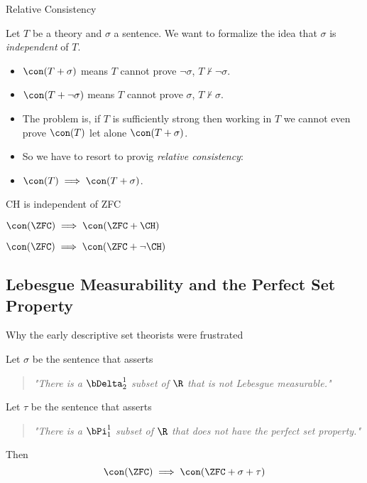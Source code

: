\documentclass{beamer}
\begin{document}
\begin{frame}{Relative Consistency}

Let $T$ be a theory and $\sigma$ a sentence. We want to formalize the
idea that $\sigma$ is \emph{independent} of $T$.

\begin{itemize}
\item $\con(T + \sigma)$ means $T$ cannot prove $\neg\sigma$, $T\not\vdash\neg\sigma$.
\item $\con(T + \neg\sigma)$ means $T$ cannot prove $\sigma$, $T\not\vdash\sigma$.
\item The problem is, if $T$ is sufficiently strong then working in $T$ we
cannot even prove $\con(T)$ let alone $\con(T + \sigma)$.
\item So we have to resort to provig \emph{relative consistency}:
\item $\con(T) \implies \con(T + \sigma)$.
\end{itemize}

\end{frame}

\begin{frame}{CH is independent of ZFC}

\begin{theorem}[G\"{o}del, 1938]
$\con(\ZFC) \implies \con(\ZFC + \CH)$
\end{theorem}

\begin{theorem}[Cohen, 1963]
$\con(\ZFC) \implies \con(\ZFC + \neg\CH)$
\end{theorem}

\end{frame}

\subsection{Lebesgue Measurability and the Perfect Set Property}

\begin{frame}{Why the early descriptive set theorists were frustrated}
\begin{theorem}[G\"{o}del, 1938]
Let $\sigma$ be the sentence that asserts
\begin{quotation}
\emph{"There is a $\bDelta^1_2$ subset
of $\R$ that is not Lebesgue measurable."}
\end{quotation}
Let $\tau$ be the sentence that asserts
\begin{quotation}
\emph{"There is a $\bPi^1_1$ subset of $\R$ that does not
have the perfect set property."}
\end{quotation}
Then
$$\con(\ZFC) \implies \con(\ZFC + \sigma + \tau)$$
\end{theorem}
\end{frame}
\end{document}

